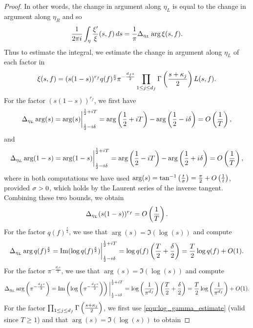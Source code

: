 \begin{proof}
      In other words, the change in argument along $\eta_{L}$ is equal to the change in argument along $\eta_{R}$ and so
      \[
        \frac{1}{2\pi i}\int_{\eta}\frac{\xi'}{\xi}(s,f)\,ds = \frac{1}{\pi}\Delta_{\eta_{L}}\arg\xi(s,f).
      \]
      Thus to estimate the integral, we estimate the change in argument along $\eta_{L}$ of each factor in
      \[
        \xi(s,f) = (s(1-s))^{r_{f}}q(f)^{\frac{s}{2}}\pi^{-\frac{d_{f}s}{2}}\prod_{1 \le j \le d_{f}}\Gamma\left(\frac{s+\kappa_{j}}{2}\right)L(s,f).
      \]
      For the factor $(s(1-s))^{r_{f}}$, we first have
      \[
        \Delta_{\eta_{L}}\arg(s) = \arg(s)\bigg|_{\frac{1}{2}-i\delta}^{\frac{1}{2}+iT} = \arg\left(\frac{1}{2}+iT\right)-\arg\left(\frac{1}{2}-i\delta\right) = O\left(\frac{1}{T}\right),
      \]
      and
      \[
        \Delta_{\eta_{L}}\arg(1-s) = \arg(1-s)\bigg|_{\frac{1}{2}-i\delta}^{\frac{1}{2}+iT} = \arg\left(\frac{1}{2}-iT\right)-\arg\left(\frac{1}{2}+i\delta\right) = O\left(\frac{1}{T}\right),
      \]
      where in both computations we have used $\arg(s) = \tan^{-1}\left(\frac{t}{\sigma}\right) = \frac{\pi}{2}+O\left(\frac{1}{t}\right)$, provided $\sigma > 0$, which holds by the Laurent series of the inverse tangent. Combining these two bounds, we obtain
      \begin{equation}\label{equ:zero_counting_1}
        \Delta_{\eta_{L}}(s(1-s))^{r_{f}} = O\left(\frac{1}{T}\right).
      \end{equation}
      For the factor $q(f)^{\frac{s}{2}}$, we use that $\arg(s) = \Im(\log(s))$ and compute
      \begin{equation}\label{equ:zero_counting_2}
        \Delta_{\eta_{L}}\arg{q(f)^{\frac{s}{2}}} = \mathrm{Im}(\log{q(f)^{\frac{s}{2}}})\bigg|_{\frac{1}{2}-i\delta}^{\frac{1}{2}+iT} = \log{q(f)}\left(\frac{T}{2}+\frac{\delta}{2}\right) = \frac{T}{2}\log{q(f)}+O(1).
      \end{equation}
      For the factor $\pi^{-\frac{d_{f}s}{2}}$, we use that $\arg(s) = \Im(\log(s))$ and compute
      \begin{equation}\label{equ:zero_counting_3}
        \Delta_{\eta_{L}}\arg\left(\pi^{-\frac{d_{f}s}{2}}\right) = \mathrm{Im}\left(\log\left(\pi^{-\frac{d_{f}s}{2}}\right)\right)\bigg|_{\frac{1}{2}-i\delta}^{\frac{1}{2}+iT} = \log\left(\frac{1}{\pi^{d_{f}}}\right)\left(\frac{T}{2}+\frac{\delta}{2}\right) = \frac{T}{2}\log\left(\frac{1}{\pi^{d_{f}}}\right)+O(1).
      \end{equation}
      For the factor $\prod_{1 \le j \le d_{f}}\Gamma\left(\frac{s+\kappa_{j}}{2}\right)$, we first use \cref{equ:log_gamma_estimate} (valid since $T \ge 1$) and that $\arg(s) = \Im(\log(s))$ to obtain

\end{proof}
